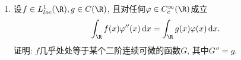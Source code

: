 \begin{quiza}
\begin{enumerate}
\begin{proof}
\begin{enumerate}[label=(\roman*)]
   又由\eqref{lemma1}可知$$M_1(\varphi) = M_1((\psi')') = - M_0(\psi') = 0.$$
   即证.

   \item
   设$$\psi_0 = \varphi - M_0(\varphi)\eta + \big(M_1(\varphi) - M_0(\varphi) M_1(\eta)\big) \eta'.$$

   只需证明$$M_0(\psi_0) = M_1(\psi_0) = 0.$$

   由于$M_0(\eta) = 1$,所以
   \begin{align*}
   M_0(\psi_0) & = M_0(\varphi) - M_0(\varphi) M_0(\eta) + \big(M_1(\varphi) - M_0(\varphi) M_1(\eta)\big) M_0(\eta') \\
   & = 0.
   \end{align*}

   又由\eqref{lemma1}可知
   \begin{align*}
   M_1(\psi_0) & = M_1(\varphi) - M_0(\varphi) M_1(\eta) + \big(M_1(\varphi) - M_0(\varphi) M_1(\eta)\big) M_1(\eta') \\
   & = M_1(\varphi) - M_0(\varphi) M_1(\eta) - \big(M_1(\varphi) - M_0(\varphi) M_1(\eta)\big) M_0(\eta) \\
   & = 0.
   \end{align*}

   即证.

\end{enumerate}
\end{proof}

\item 设\(f\in L_{loc}^1(\R),g\in C(\R)\), 
且对任何\(\varphi\in C_c^{\infty}(\R)\)成立
\[\int_{\R}f(x)\varphi''(x)\,\dd x=\int_{\R}g(x)\varphi(x)\,\dd x.\]
证明: \(f\)几乎处处等于某个二阶连续可微的函数\(G\), 其中\(G''=g\).
\end{enumerate}
\end{quiza}

